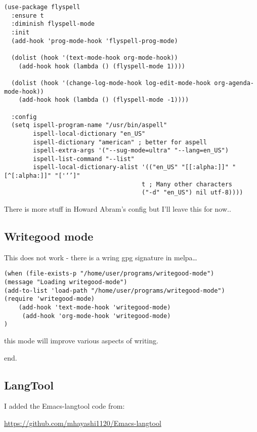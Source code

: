 \documentclass[12pt]{article}
\begin{document}
\lstset{language=Lisp,label= ,caption= ,numbers=none}
\begin{lstlisting}
(use-package flyspell
  :ensure t
  :diminish flyspell-mode
  :init
  (add-hook 'prog-mode-hook 'flyspell-prog-mode)

  (dolist (hook '(text-mode-hook org-mode-hook))
    (add-hook hook (lambda () (flyspell-mode 1))))

  (dolist (hook '(change-log-mode-hook log-edit-mode-hook org-agenda-mode-hook))
    (add-hook hook (lambda () (flyspell-mode -1))))

  :config
  (setq ispell-program-name "/usr/bin/aspell"
        ispell-local-dictionary "en_US"
        ispell-dictionary "american" ; better for aspell
        ispell-extra-args '("--sug-mode=ultra" "--lang=en_US")
        ispell-list-command "--list"
        ispell-local-dictionary-alist '(("en_US" "[[:alpha:]]" "[^[:alpha:]]" "['‘’]"
                                      t ; Many other characters
                                      ("-d" "en_US") nil utf-8))))
\end{lstlisting}

There is more stuff in Howard Abram's config but I'll leave this for now..



\subsection{Writegood mode}
\label{sec-6-2}
This does not work - there is a wring gpg signature in melpa\ldots{} 

\lstset{language=Lisp,label= ,caption= ,numbers=none}
\begin{lstlisting}
(when (file-exists-p "/home/user/programs/writegood-mode")
(message "Loading writegood-mode")
(add-to-list 'load-path "/home/user/programs/writegood-mode")
(require 'writegood-mode)
    (add-hook 'text-mode-hook 'writegood-mode)
     (add-hook 'org-mode-hook 'writegood-mode)
)
\end{lstlisting}

this mode will improve various aspects of writing. 

end.


\subsection{LangTool}
\label{sec-6-3}

I added the Emacs-langtool code from:

\url{https://github.com/mhayashi1120/Emacs-langtool}
\end{document}
